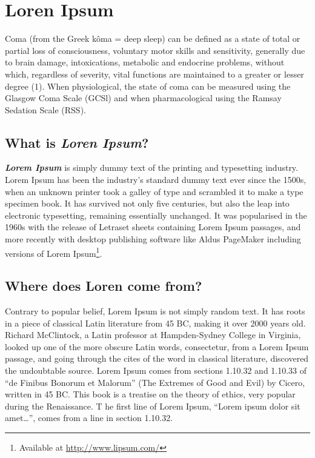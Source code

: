 \chapter{Loren Ipsum} \label{ap1:loren}

Coma (from the Greek kôma = deep sleep) can be defined as a state of total or partial loss of consciousness, voluntary motor skills and sensitivity, generally due to brain damage, intoxications, metabolic and endocrine problems, without which, regardless of severity, vital functions are maintained to a greater or lesser degree (1). When physiological, the state of coma can be measured using the Glasgow Coma Scale (GCSl) and when pharmacological using the Ramsay Sedation Scale (RSS).

\section{What is \emph{Loren Ipsum}?}

\emph{\textbf{Lorem Ipsum}} is simply dummy text of the printing and
typesetting industry. Lorem Ipsum has been the industry's standard
dummy text ever since the 1500s, when an unknown printer took a galley
of type and scrambled it to make a type specimen book.
It has survived not only five centuries, but also the leap into
electronic typesetting, remaining essentially unchanged.
It was popularised in the 1960s with the release of Letraset sheets
containing Lorem Ipsum passages, and more recently with desktop
publishing software like Aldus PageMaker including versions of Lorem
Ipsum\footnote{Available at \url{http://www.lipsum.com/}}.

\section{Where does Loren come from?}

Contrary to popular belief, Lorem Ipsum is not simply random text.
It has roots in a piece of classical Latin literature from 45 BC,
making it over 2000 years old.
Richard McClintock, a Latin professor at Hampden-Sydney College in
Virginia, looked up one of the more obscure Latin words, consectetur,
from a Lorem Ipsum passage, and going through the cites of the word in
classical literature, discovered the undoubtable source.
Lorem Ipsum comes from sections 1.10.32 and 1.10.33 of ``de Finibus
Bonorum et Malorum'' (The Extremes of Good and Evil) by Cicero,
written in 45 BC.
This book is a treatise on the theory of ethics, very popular during
the Renaissance. T
he first line of Lorem Ipsum, ``Lorem ipsum dolor sit amet\ldots'',
comes from a line in section 1.10.32.

